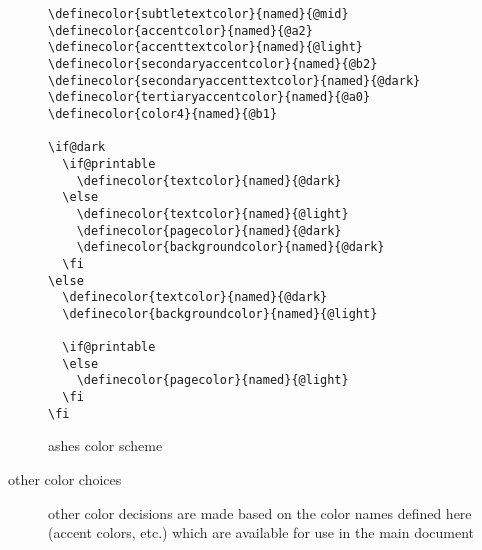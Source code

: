 \documentclass[lowerhead,12pt]{aesthetic}
\begin{document}
\begin{description}
\begin{listing}
\begin{verbatim}
\definecolor{subtletextcolor}{named}{@mid}
\definecolor{accentcolor}{named}{@a2}
\definecolor{accenttextcolor}{named}{@light}
\definecolor{secondaryaccentcolor}{named}{@b2}
\definecolor{secondaryaccenttextcolor}{named}{@dark}
\definecolor{tertiaryaccentcolor}{named}{@a0}
\definecolor{color4}{named}{@b1}

\if@dark
  \if@printable
    \definecolor{textcolor}{named}{@dark}
  \else
    \definecolor{textcolor}{named}{@light}
    \definecolor{pagecolor}{named}{@dark}
    \definecolor{backgroundcolor}{named}{@dark}
  \fi
\else
  \definecolor{textcolor}{named}{@dark}
  \definecolor{backgroundcolor}{named}{@light}

  \if@printable
  \else
    \definecolor{pagecolor}{named}{@light}
  \fi
\fi
    \end{verbatim}
    \caption{ashes color scheme}
    \label{lst:ashes}
  \end{listing}

  \item[other color choices] other color decisions are made based on the color names defined here (accent colors, etc.) which are available for use in the main document
\end{description}

\makeappendix
\makebackmatter
\end{document}
